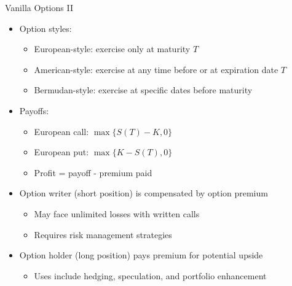 \documentclass[10pt,handout]{beamer}
\begin{document}
\begin{frame}{Vanilla Options II}
  \begin{itemize}[<+->]
    \item Option styles:
      \begin{itemize}
        \item European-style: exercise only at maturity $T$
        \item American-style: exercise at any time before or at expiration date $T$
        \item Bermudan-style: exercise at specific dates before maturity
      \end{itemize}
    \item Payoffs:
      \begin{itemize}
        \item European call: $\max\{S(T) - K, 0\}$
        \item European put: $\max\{K - S(T), 0\}$
        \item Profit = payoff - premium paid
      \end{itemize}
    \item Option writer (short position) is compensated by option premium
      \begin{itemize}
        \item May face unlimited losses with written calls
        \item Requires risk management strategies
      \end{itemize}
    \item Option holder (long position) pays premium for potential upside
      \begin{itemize}
        \item Uses include hedging, speculation, and portfolio enhancement
      \end{itemize}
  \end{itemize}
\end{frame}
\end{document}

